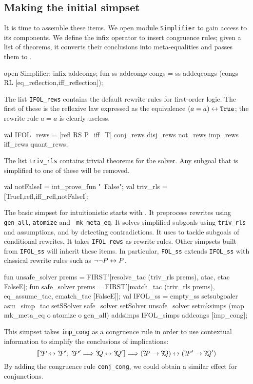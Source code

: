 \subsection{Making the initial simpset}
It is time to assemble these items.  We open module {\tt Simplifier} to
gain access to its components.  We define the infix operator
 to insert congruence rules; given a list of theorems,
it converts their conclusions into meta-equalities and passes them to
.
\begin{ttbox}
open Simplifier;
\ttbreak
infix addcongs;
fun ss addcongs congs =
    ss addeqcongs (congs RL [eq_reflection,iff_reflection]);
\end{ttbox}
The list {\tt IFOL_rews} contains the default rewrite rules for first-order
logic.  The first of these is the reflexive law expressed as the
equivalence $(a=a)\leftrightarrow{\tt True}$; the rewrite rule $a=a$ is clearly useless.
\begin{ttbox}
val IFOL_rews =
   [refl RS P_iff_T] \at conj_rews \at disj_rews \at not_rews \at 
    imp_rews \at iff_rews \at quant_rews;
\end{ttbox}
The list {\tt triv_rls} contains trivial theorems for the solver.  Any
subgoal that is simplified to one of these will be removed.
\begin{ttbox}
val notFalseI = int_prove_fun "~False";
val triv_rls = [TrueI,refl,iff_refl,notFalseI];
\end{ttbox}
%
The basic simpset for intuitionistic \FOL{} starts with .
It preprocess rewrites using {\tt gen_all}, {\tt atomize} and {\tt
  mk_meta_eq}.  It solves simplified subgoals using {\tt triv_rls} and
assumptions, and by detecting contradictions.  
It uses  to tackle subgoals of
conditional rewrites.  It takes {\tt IFOL_rews} as rewrite rules.  
Other simpsets built from {\tt IFOL_ss} will inherit these items.
In particular, {\tt FOL_ss} extends {\tt IFOL_ss} with classical rewrite
rules such as $\neg\neg P\leftrightarrow P$.
\begin{ttbox}
fun unsafe_solver prems = FIRST'[resolve_tac (triv_rls \at prems),
                                 atac, etac FalseE];
fun   safe_solver prems = FIRST'[match_tac (triv_rls \at prems),
                                 eq_assume_tac, ematch_tac [FalseE]];
val IFOL_ss = empty_ss setsubgoaler asm_simp_tac
                       setSSolver   safe_solver
                       setSolver  unsafe_solver
                       setmksimps (map mk_meta_eq o atomize o gen_all)
                       addsimps IFOL_simps
                       addcongs [imp_cong];
\end{ttbox}
This simpset takes {\tt imp_cong} as a congruence rule in order to use
contextual information to simplify the conclusions of implications:
\[ \List{\Var{P}\bimp\Var{P'};\; \Var{P'} \Imp \Var{Q}\bimp\Var{Q'}} \Imp
   (\Var{P}\imp\Var{Q}) \bimp (\Var{P'}\imp\Var{Q'})
\]
By adding the congruence rule {\tt conj_cong}, we could obtain a similar
effect for conjunctions.


